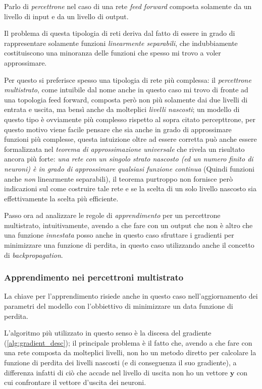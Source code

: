 \documentclass[../../main.tex]{subfiles}
\begin{document}
Parlo di \textit{percettrone} nel caso di una rete \textit{feed forward} composta solamente da un livello di input e da un livello di output.

Il problema di questa tipologia di reti deriva dal fatto di essere in grado di rappresentare solamente funzioni \textit{linearmente separabili}, che indubbiamente costituiscono una minoranza delle funzioni che spesso mi trovo a voler approssimare.

Per questo si preferisce spesso una tipologia di rete più complessa: il \textit{percettrone multistrato}, come intuibile dal nome anche in questo caso mi trovo di fronte ad una topologia feed forward, composta però non più solamente dai due livelli di entrata e uscita, ma bensì anche da molteplici \textit{livelli nascosti}; un modello di questo tipo è ovviamente più complesso rispetto al sopra citato percepttrone, per questo motivo viene facile pensare che sia anche in grado di approssimare funzioni più complesse, questa intuizione oltre ad essere corretta può anche essere formalizzata nel \textit{teorema di approssimazione universale} che rivela un risultato ancora più forte:
\textit{una rete con un singolo strato nascosto (ed un numero finito di neuroni) è in grado di approssimare qualsiasi funzione continua} (Quindi funzioni anche \textit{non} linearmente separabili), il teorema purtroppo non fornisce però indicazioni sul come costruire tale rete e se la scelta di un solo livello nascosto sia effettivamente la scelta più efficiente.

Passo ora ad analizzare le regole di \textit{apprendimento} per un percettrone multistrato, intuitivamente, avendo a che fare con un output che non è altro che una funzione \textit{innestata} posso anche in questo caso sfruttare i gradienti per minimizzare una funzione di perdita, in questo caso utilizzando anche il concetto di \textit{backpropagation}.

\subsubsection{Apprendimento nei percettroni multistrato}
La chiave per l'apprendimento risiede anche in questo caso nell'aggiornamento dei parametri del modello con l'obbiettivo di minimizzare un data funzione di perdita.

L'algoritmo più utilizzato in questo senso è la discesa del gradiente (\ref{alg:gradient_desc}); il principale problema è il fatto che, avendo a che fare con una rete composta da molteplici livelli, non ho un metodo diretto per calcolare la funzione di perdita dei livelli nascosti (e di conseguenza il suo gradiente), a differenza infatti di ciò che accade nel livello di uscita non ho un vettore $\boldsymbol{y}$ con cui confrontare il vettore d'uscita dei neuroni.
\end{document}
